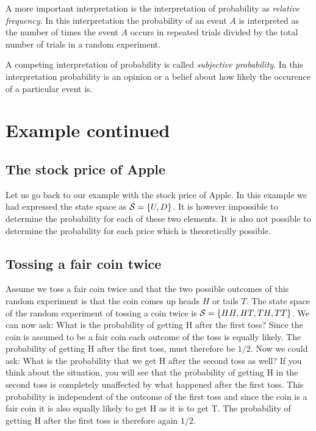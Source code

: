 \documentclass[
]{book}
\begin{document}
A more important interpretation is the interpretation of probability as \emph{relative frequency}.
In this interpretation the probability of an event \(A\) is interpreted as the number of times
the event \(A\) occurs in repeated trials divided by the total number of trials in a
random experiment.

A competing interpretation of probability is called \emph{subjective probability}. In this
interpretation probability is an opinion or a belief about how likely the occurence of
a particular event is.

\hypertarget{example-continued}{%
\section{Example continued}\label{example-continued}}

\hypertarget{the-stock-price-of-apple-1}{%
\subsection{The stock price of Apple}\label{the-stock-price-of-apple-1}}

Let us go back to our example with the stock price of Apple. In this example we had expressed
the state space as \({\cal S}=\{U, D\}\). It is however impossible to determine the probability
for each of these two elements. It is also not possible to determine the probability
for each price which is theoretically possible.

\hypertarget{tossing-a-fair-coin-twice}{%
\subsection{Tossing a fair coin twice}\label{tossing-a-fair-coin-twice}}

Assume we toss a fair coin twice and that the two possible outcomes
of this random experiment is that the coin comes up heads \(H\) or tails \(T\).
The state space of the random experiment of tossing a coin twice is
\({\cal S} = \{HH, HT, TH, TT\}\). We can now ask: What is the probability of getting H
after the first toss? Since the coin is assumed to be a fair coin each outcome of
the toss is equally likely. The probability of getting H after the first toss, must
therefore be \(1/2\). Now we could ask: What is the probability that we get H after the second
toss as well? If you think about the situation, you will see that the probability of
getting H in the second toss is completely unaffected by what happened after the first toss.
This probability is independent of the outcome of the first toss and since the coin is
a fair coin it is also equally likely to get H as it is to get T. The probability of getting
H after the first toss is therefore again \(1/2\).
\end{document}
